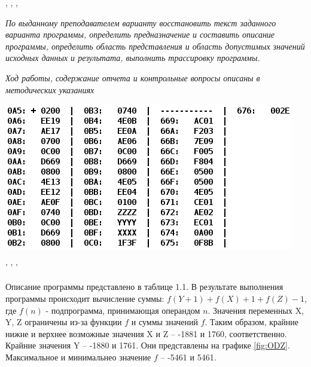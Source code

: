 \tableofcontents


\newpage
\Chapter{\lab\ \labnumber}{\labtheme}{}

\begin{center}
, , ,
\end{center}
\noindent

\textit{По выданному преподавателем варианту восстановить текст заданного варианта программы, определить предназначение и составить описание программы, определить область представления и область допустимых значений исходных данных и результата, выполнить трассировку программы.}

\textit{Ход работы, содержание отчета и контрольные вопросы описаны в методических указаниях}

\begin{center}
    \includegraphics[width=0.7\paperwidth]{figures/task.png}
\end{center}
\begin{center}
    ' ' '
\end{center}

\newpage
{}


Описание программы представлено в таблице 1.1. %
В результате выполнения программы происходит вычисление суммы: $f(Y+1)+f(X)+1+f(Z)-1$, где $f(n)$ - подпрограмма, принимающая операндом $n$.
Значения переменных X, Y, Z ограничены из-за функции $f$ и суммы значений $f$.
Таким образом, крайние нижне и верхнее возможные значения X и Z -- -1881 и 1760, соответственно.
Крайние значения Y -- -1880 и 1761. Они представлены на графике \ref{fig:ODZ}.
Максимальное и минимальнео значение $f$ -- -5461 и 5461.

